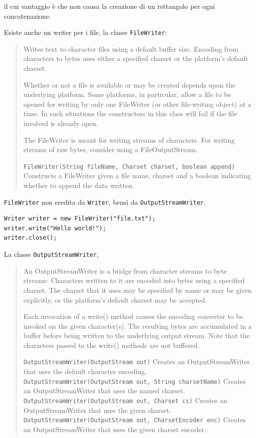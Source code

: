 \documentclass[\fontsizeclass,twocolumn]{\classname}
\theoremstyle{definition}
\theoremstyle{definition}
\begin{document}
il cui vantaggio è che non causa la creazione di un rettangolo per ogni
concatenazione.

Esiste anche un writer per i file, la classe \texttt{FileWriter}:
\begin{quote}
    \footnotesize{Writes text to character files using a default buffer size. Encoding from characters to bytes uses either a specified charset or the platform's default charset.

Whether or not a file is available or may be created depends upon the underlying platform. Some platforms, in particular, allow a file to be opened for writing by only one FileWriter (or other file-writing object) at a time. In such situations the constructors in this class will fail if the file involved is already open.

The FileWriter is meant for writing streams of characters. For writing streams of raw bytes, consider using a FileOutputStream.


\texttt{FileWriter(String fileName, Charset charset, boolean append)}
Constructs a FileWriter given a file name, charset and a boolean indicating
whether to append the data written.
}
\end{quote}

\texttt{FileWriter} non eredita da \texttt{Writer}, bensì da
\texttt{OutputStreamWriter}.

\begin{lstlisting}
Writer writer = new FileWriter("file.txt");
writer.write("Hello world!");
writer.close();
\end{lstlisting}

La classe \texttt{OutputStreamWriter},

\begin{quote}
    \footnotesize{An OutputStreamWriter is a bridge from character streams to byte streams: Characters written to it are encoded into bytes using a specified charset. The charset that it uses may be specified by name or may be given explicitly, or the platform's default charset may be accepted.

Each invocation of a write() method causes the encoding converter to be invoked on the given character(s). The resulting bytes are accumulated in a buffer before being written to the underlying output stream. Note that the characters passed to the write() methods are not buffered.


\texttt{OutputStreamWriter(OutputStream out)} 	Creates an OutputStreamWriter that uses the default character encoding.
    \texttt{OutputStreamWriter(OutputStream out, String charsetName)} 	Creates an OutputStreamWriter that uses the named charset.
    \texttt{OutputStreamWriter(OutputStream out, Charset cs)} 	Creates an OutputStreamWriter that uses the given charset.
\texttt{OutputStreamWriter(OutputStream out, CharsetEncoder enc)} 	Creates an OutputStreamWriter that uses the given charset encoder.
}
\end{quote}
\end{document}
